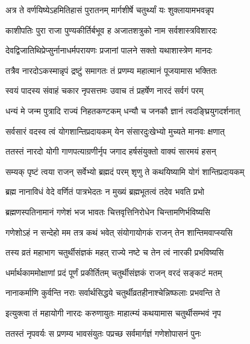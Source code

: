 
\twolineshloka
{अत्र ते वर्णयिष्येऽहमितिहासं पुरातनम्}
{मार्गशीर्षे चतुर्थ्यां यः शुक्लायामभवन्नृप} %

\twolineshloka
{काशीपतिः पुरा राजा पुण्यकीर्तिर्बभूव ह}
{अजातशत्रुको नाम सर्वशास्त्रविशारदः} %

\twolineshloka
{देवद्विजातिथिप्रेप्सुर्नानाधर्मपरायणः}
{प्रजानां पालने सक्तो यथाशास्त्रेण मानदः} %

\twolineshloka
{तत्रैव नारदोऽकस्मान्नृपं द्रष्टुं समागतः}
{तं प्रणम्य महात्मानं पूजयामास भक्तितः} %

\twolineshloka
{स्वयं पादस्य संवाहं चकार नृपसत्तमः}
{उवाच तं प्रहर्षेण नारदं सर्वगं परम्} %


\twolineshloka
{धन्यं मे जन्म पुत्रादि राज्यं निहतकण्टकम्}
{धन्यौ च जनकौ ज्ञानं त्वदङ्घ्रियुगदर्शनात्} %

\twolineshloka
{सर्वसारं वदस्व त्वं योगशान्तिप्रदायकम्}
{येन संसारदुःखेभ्यो मुच्यते मानवः क्षणात्} %

\twolineshloka
{ततस्तं नारदो योगी गाणपत्याग्रणीर्नृप}
{जगाद हर्षसंयुक्तो वाक्यं सारमयं हसन्} %


\twolineshloka
{सम्यक् पृष्टं त्वया राजन् सर्वेभ्यो ब्रह्मदं परम्}
{श‍ृणु ते कथयिष्यामि योगं शान्तिप्रदायकम्} %

\twolineshloka
{ब्रह्म नानाविधं वेदे वर्णितं पात्रभेदतः}
{न मुख्यं ब्रह्मभूतत्वं तदेव भवति प्रभो} %

\twolineshloka
{ब्रह्मणस्पतिनामानं गणेशं भज भावतः}
{चित्तवृत्तिनिरोधेन चिन्तामणिर्भविष्यसि} %

\twolineshloka
{गणेशोऽहं न सन्देहो मम तत्र कथं भवेत्}
{संयोगायोगकं राजन् तेन शान्तिमवाप्स्यसि} %

\twolineshloka
{तस्य व्रतं महाभाग चतुर्थीसंज्ञकं महत्}
{राज्ये नष्टे च तेन त्वं नारकी प्रभविष्यसि} %

\twolineshloka
{धर्मार्थकाममोक्षाणां प्रदं पूर्णं प्रकीर्तितम्}
{चतुर्थीसंज्ञकं राजन् वरदं सङ्कटं मतम्} %

\twolineshloka
{नानाकर्माणि कुर्वन्ति नराः सर्वार्थसिद्धये}
{चतुर्थीव्रतहीनाश्चेन्निष्फलाः प्रभवन्ति ते} %

\twolineshloka
{इत्युक्त्वा तं महायोगी नारदः करुणायुतः}
{माहात्म्यं कथयामास चतुर्थीसम्भवं नृप} %

\twolineshloka
{ततस्तं नृपवर्यः स प्रणम्य भावसंयुतः}
{पप्रच्छ सर्वमार्गज्ञं गणेशोपासनं पुनः} %

